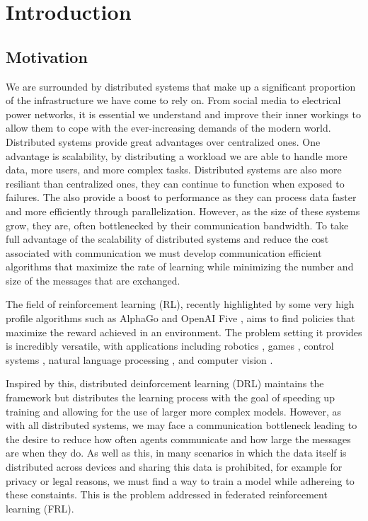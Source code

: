 \chapter{Introduction}

\section{Motivation}
We are surrounded by distributed systems that make up a significant proportion of the infrastructure we have come to rely on. 
From social media to electrical power networks, it is essential we understand and improve their inner workings to allow them to cope with the ever-increasing demands of the modern world. 
Distributed systems provide great advantages over centralized ones. 
One advantage is scalability, by distributing a workload we are able to handle more data, more users, and more complex tasks.
Distributed systems are also more resiliant than centralized ones, they can continue to function when exposed to failures.
The also provide a boost to performance as they can process data faster and more efficiently through parallelization. 
However, as the size of these systems grow, they are, often bottlenecked by their communication bandwidth. To take full advantage of the scalability of distributed systems and reduce the cost associated with communication we must develop communication efficient algorithms that maximize the rate of learning while minimizing the number and size of the messages that are exchanged.

The field of reinforcement learning (RL), recently highlighted by some very high profile algorithms such as AlphaGo \cite{AlphaGo} and OpenAI Five \cite{OpenAIFive}, aims to find policies that maximize the reward achieved in an environment. The problem setting it provides is incredibly versatile, with applications including robotics \cite{TableTennis}, games \cite{AlphaStar}, control systems \cite{TriplePendulum}, natural language processing \cite{RLHF}, and computer vision \cite{Vision}. 

Inspired by this, distributed deinforcement learning (DRL) maintains the framework but distributes the learning process with the goal of speeding up training and allowing for the use of larger more complex models. However, as with all distributed systems, we may face a communication bottleneck leading to the desire to reduce how often agents communicate and how large the messages are when they do.
As well as this, in many scenarios in which the data itself is distributed across devices and sharing this data is prohibited, for example for privacy or legal reasons, we must find a way to train a model while adhereing to these constaints. This is the problem addressed in federated reinforcement learning (FRL).

